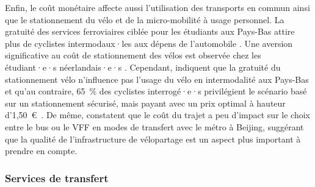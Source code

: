 \begin{refsegment}
Enfin, le coût monétaire affecte aussi l'utilisation des transports en commun ainsi que le stationnement du vélo et de la micro-mobilité à usage personnel. La gratuité des services ferroviaires ciblée pour les étudiants aux Pays-Bas attire plus de cyclistes intermodaux·les aux dépens de l'automobile \textcolor{blue}{\autocite[360]{givoni_access_2007}}. Une aversion significative au coût de stationnement des vélos est observée chez les étudiant·e·s néerlandais·e·s \textcolor{blue}{\autocite[667]{mil_insights_2020}}. Cependant, \textcolor{blue}{\textcite[10]{molin_bicycle_2015}} indiquent que la gratuité du stationnement vélo n'influence pas l'usage du vélo en intermodalité aux Pays-Bas et qu'au contraire, 65~\% des cyclistes interrogé·e·s privilégient le scénario basé sur un stationnement sécurisé, mais payant avec un prix optimal à hauteur d'1,50~\euro~. De même, \textcolor{blue}{\textcite[5]{liu_mode_2022}} constatent que le coût du trajet a peu d'impact sur le choix entre le bus ou le \acrshort{VFF} en modes de transfert avec le métro à Beijing, suggérant que la qualité de l'infrastructure de vélopartage est un aspect plus important à prendre en compte.%

\subsubsection*{Services de transfert
    \label{chap2:services-transfert}
    }
    

\end{refsegment}
